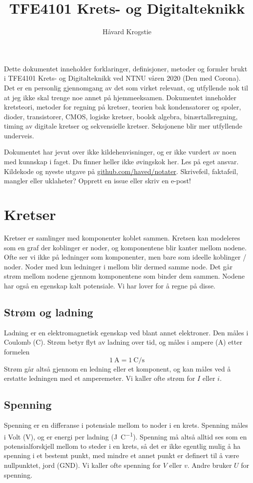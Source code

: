 \documentclass[12pt,a4paper,norsk]{article}
\title{TFE4101 Krets- og Digitalteknikk}
\author{Håvard Krogstie\\\randomize{\lst{}.\fst{}@gmail.com}}
\date{\date{\Filemodtoday{\jobname}}}
\begin{document}
\maketitle

\noindent
Dette dokumentet inneholder forklaringer, definisjoner, metoder og formler brukt
i TFE4101 Krets- og Digitalteknikk ved NTNU våren 2020 (Den med Corona). Det er
en personlig gjennomgang av det som virket relevant, og utfyllende nok til at jeg
ikke skal trenge noe annet på hjemmeeksamen. Dokumentet inneholder kretsteori,
metoder for regning på kretser, teorien bak kondensatorer og spoler, dioder,
transistorer, CMOS, logiske kretser, boolsk algebra, binærtallsregning, timing
av digitale kretser og sekvensielle kretser. Seksjonene blir mer utfyllende
underveis.

Dokumentet har jevnt over ikke kildehenvisninger, og er ikke vurdert av noen
med kunnskap i faget. Du finner heller ikke øvingskok her. Les på eget ansvar.
Kildekode og nyeste utgave på
\href{https://github.com/haved/notater/}{github.com/haved/notater}. Skrivefeil,
faktafeil, mangler eller uklaheter? Opprett en issue eller skriv en e-post!

\clearpage
\tableofcontents
\clearpage

\section{Kretser}
Kretser er samlinger med komponenter koblet sammen. Kretsen kan modeleres som en
graf der koblinger er noder, og komponentene blir kanter mellom
nodene. Ofte ser vi ikke på ledninger som komponenter, men bare som
ideelle koblinger / noder. Noder med kun ledninger i mellom blir dermed samme
node. Det går strøm mellom nodene gjennom komponentene som binder dem sammen.
Nodene har også en egenskap kalt potensiale. Vi har lover for å regne på disse.

\subsection{Strøm og ladning}
Ladning er en elektromagnetisk egenskap ved blant annet elektroner. Den måles i
Coulomb (\si{\coulomb}). Strøm betyr flyt av ladning over tid, og måles i ampere
(\si{\ampere}) etter formelen
\[\SI{1}{\ampere} = \SI{1}{\coulomb\per\second}\]
Strøm går altså gjennom en ledning eller et komponent, og kan måles ved å
erstatte ledningen med et amperemeter. Vi kaller ofte strøm for $I$ eller $i$.

\subsection{Spenning}
Spenning er en differanse i potensiale mellom to noder i en krets. Spenning
måles i Volt (\si{\volt}), og er energi per ladning (\si{\joule\per\coulomb}).
Spenning må altså alltid ses som en potensialforskjell mellom to steder i en
krets, så det er ikke egentlig mulig å ha spenning i et bestemt punkt, med
mindre et annet punkt er definert til å være nullpunktet, jord (GND). Vi kaller
ofte spenning for $V$ eller $v$. Andre bruker $U$ for spenning.
\end{document}
